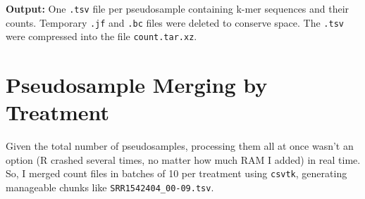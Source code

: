 \documentclass[
]{book}
\newenvironment{Shaded}{\begin{snugshade}}{\end{snugshade}}
\newcommand{\AttributeTok}[1]{\textcolor[rgb]{0.77,0.63,0.00}{#1}}
\newcommand{\BuiltInTok}[1]{#1}
\newcommand{\CommentTok}[1]{\textcolor[rgb]{0.56,0.35,0.01}{\textit{#1}}}
\newcommand{\ExtensionTok}[1]{#1}
\newcommand{\FunctionTok}[1]{\textcolor[rgb]{0.00,0.00,0.00}{#1}}
\newcommand{\NormalTok}[1]{#1}
\newcommand{\OperatorTok}[1]{\textcolor[rgb]{0.81,0.36,0.00}{\textbf{#1}}}
\newcommand{\StringTok}[1]{\textcolor[rgb]{0.31,0.60,0.02}{#1}}
\newcommand{\VariableTok}[1]{\textcolor[rgb]{0.00,0.00,0.00}{#1}}
\begin{document}
\begin{Shaded}
\end{Shaded}

\textbf{Output:} One \texttt{.tsv} file per pseudosample containing k-mer sequences and their counts. Temporary \texttt{.jf} and \texttt{.bc} files were deleted to conserve space. The \texttt{.tsv} were compressed into the file \texttt{count.tar.xz}.

\hypertarget{pseudosample-merging-by-treatment}{%
\section{Pseudosample Merging by Treatment}\label{pseudosample-merging-by-treatment}}

Given the total number of pseudosamples, processing them all at once wasn't an option (R crashed several times, no matter how much RAM I added) in real time. So, I merged count files in batches of 10 per treatment using \texttt{csvtk}, generating manageable chunks like \texttt{SRR1542404\_00-09.tsv}.
\end{document}
